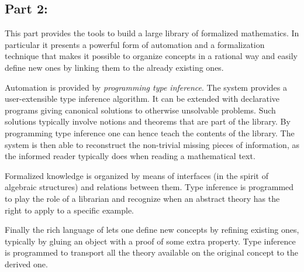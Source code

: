 
\subsection*{Part 2: \parttwoname{}}

This part provides the tools to build a large library of formalized
mathematics.  In particular it presents a powerful form of automation
and a formalization technique that makes it possible to organize
concepts in a rational way and easily define new ones by linking them
to the already existing ones.

Automation is provided by \emph{programming type inference}.
The \Coq{} system provides a user-extensible type inference
algorithm.  It can be extended with declarative programs
giving canonical solutions to otherwise unsolvable problems.
Such solutions typically involve notions and theorems that
are part of the \mcbMC{} library.  By programming type inference
one can hence teach \Coq{} the contents of the library.  The system
is then able to reconstruct the non-trivial missing pieces of information,
as the informed reader typically does when reading a mathematical text.

Formalized knowledge is organized by means of interfaces (in the spirit of
algebraic structures) and relations between them.  Type inference is programmed
to play the role of a librarian and recognize when an abstract theory has the
right to apply to a specific example.

Finally the rich language of \Coq{} lets one define new concepts
by refining existing ones, typically by gluing an object with
a proof of some extra property.  Type inference is programmed
to transport all the theory available on
the original concept to the derived one.



